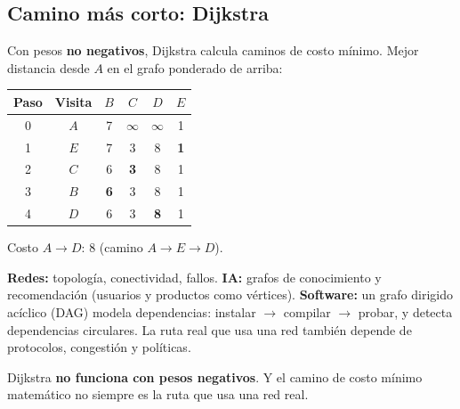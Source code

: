 \subsection{Camino m\'as corto: Dijkstra}
Con pesos \textbf{no negativos}, Dijkstra calcula caminos de costo m\'inimo. Mejor distancia desde $A$ en el grafo ponderado de arriba:

\begin{center}
\begin{tabular}{|c|c|c|c|c|c|}
\hline
\rowcolor{tmAzulClaro}\textbf{Paso} & \textbf{Visita} & \textbf{$B$} & \textbf{$C$} & \textbf{$D$} & \textbf{$E$}\\ \hline
0 & $A$ & 7 & $\infty$ & $\infty$ & 1\\ \hline
1 & $E$ & 7 & 3 & 8 & \textbf{1}\\ \hline
2 & $C$ & 6 & \textbf{3} & 8 & 1\\ \hline
3 & $B$ & \textbf{6} & 3 & 8 & 1\\ \hline
4 & $D$ & 6 & 3 & \textbf{8} & 1\\ \hline
\end{tabular}
\end{center}
Costo $A\to D$: $8$ (camino $A\to E\to D$).

\begin{tmsistemas}
\textbf{Redes:} topolog\'ia, conectividad, fallos. \textbf{IA:} grafos de conocimiento y recomendaci\'on (usuarios y productos como v\'ertices). \textbf{Software:} un grafo dirigido ac\'iclico (DAG) modela dependencias: instalar $\to$ compilar $\to$ probar, y detecta dependencias circulares. La ruta real que usa una red tambi\'en depende de protocolos, congesti\'on y pol\'iticas.
\end{tmsistemas}

\begin{tmcuidado}Dijkstra \textbf{no funciona con pesos negativos}. Y el camino de costo m\'inimo matem\'atico no siempre es la ruta que usa una red real.\end{tmcuidado}


